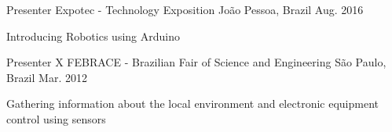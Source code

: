 \begin{cventries}
  \cventry
    {Presenter} %
    {Expotec - Technology Exposition} %
    {João Pessoa, Brazil} %
    {Aug. 2016} %
    {
      \begin{cvitems} %
        \item {Introducing Robotics using Arduino}
      \end{cvitems}
    }
  \cventry
    {Presenter} %
    {X FEBRACE - Brazilian Fair of Science and Engineering} %
    {São Paulo, Brazil} %
    {Mar. 2012} %
    {
      \begin{cvitems} %
        \item {Gathering information about the local environment and electronic equipment control using sensors}
      \end{cvitems}
    }
\end{cventries}
